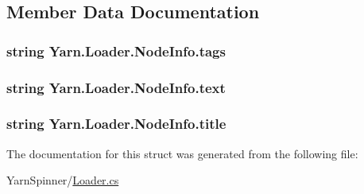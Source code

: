 \subsection{Member Data Documentation}
\hypertarget{a00070_acd4d4915f6cc14f8b0f1f92d27da8b36}{
\subsubsection[{tags}]{\setlength{\rightskip}{0pt plus 5cm}string Yarn.\-Loader.\-Node\-Info.\-tags}}\label{a00070_acd4d4915f6cc14f8b0f1f92d27da8b36}
\hypertarget{a00070_a63d7ebed8095a20fc5d0d74c84a34f6c}{
\subsubsection[{text}]{\setlength{\rightskip}{0pt plus 5cm}string Yarn.\-Loader.\-Node\-Info.\-text}}\label{a00070_a63d7ebed8095a20fc5d0d74c84a34f6c}
\hypertarget{a00070_aafc45bbc86a9acb9bdbcf7877695a96c}{
\subsubsection[{title}]{\setlength{\rightskip}{0pt plus 5cm}string Yarn.\-Loader.\-Node\-Info.\-title}}\label{a00070_aafc45bbc86a9acb9bdbcf7877695a96c}


The documentation for this struct was generated from the following file\-:\begin{DoxyCompactItemize}
\item 
Yarn\-Spinner/\hyperlink{a00142}{Loader.\-cs}\end{DoxyCompactItemize}
